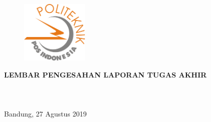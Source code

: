 \begin{pengesahan}
\thispagestyle{plain}
	
\begin{figure}[!htbp]
	\centering
	\includegraphics[width=32mm]{figures/logo-poltekpos} \\[4ex]
\end{figure} 

\centering\textbf{LEMBAR PENGESAHAN LAPORAN TUGAS AKHIR} \\[2ex]

 \\
 \\
 \\[2ex]

Bandung, 27 Agustus 2019 \\[2ex]


\end{pengesahan}
